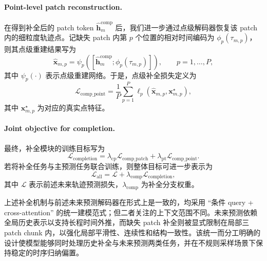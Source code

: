 \paragraph{Point-level patch reconstruction.}
在得到补全后的 patch token $\hat{\bm{h}}_m^{\mathrm{comp}}$ 后，我们进一步通过点级解码器恢复该 patch 内的细粒度轨迹点。记缺失 patch 内第 $p$ 个位置的相对时间编码为 $\phi_p(\tau_{m,p})$，则其点级重建结果写为
\begin{equation}
\hat{\bm{x}}_{m,p} = \psi_p\!\left([\hat{\bm{h}}_m^{\mathrm{comp}}; \phi_p(\tau_{m,p})]\right), \qquad p=1,\dots,P,
\end{equation}
其中 $\psi_p(\cdot)$ 表示点级重建网络。于是，点级补全损失定义为
\begin{equation}
\mathcal{L}_{\mathrm{comp\_point}} =
\frac{1}{P} \sum_{p=1}^{P}
\ell_p\!\left(\hat{\bm{x}}_{m,p}, \bm{x}_{m,p}^{\star}\right),
\end{equation}
其中 $\bm{x}_{m,p}^{\star}$ 为对应的真实点特征。

\paragraph{Joint objective for completion.}
最终，补全模块的训练目标写为
\begin{equation}
\mathcal{L}_{\mathrm{completion}} =
\lambda_{\mathrm{cp}} \mathcal{L}_{\mathrm{comp\_patch}} +
\lambda_{\mathrm{pt}} \mathcal{L}_{\mathrm{comp\_point}}.
\end{equation}
若将补全任务与主预测任务联合训练，则整体目标可进一步表示为
\begin{equation}
\mathcal{L}_{\mathrm{all}} =
\mathcal{L} + \lambda_{\mathrm{comp}} \mathcal{L}_{\mathrm{completion}},
\end{equation}
其中 $\mathcal{L}$ 表示前述未来轨迹预测损失，$\lambda_{\mathrm{comp}}$ 为补全分支权重。

上述补全机制与前述未来预测解码器在形式上是一致的，均采用 ``条件 query + cross-attention'' 的统一建模范式；但二者关注的上下文范围不同。未来预测依赖全局历史表示以支持长程时间外推，而缺失 patch 补全则被显式限制在局部三 patch chunk 内，以强化局部平滑性、连续性和结构一致性。该统一而分工明确的设计使模型能够同时处理历史补全与未来预测两类任务，并在不规则采样场景下保持稳定的时序归纳偏置。

